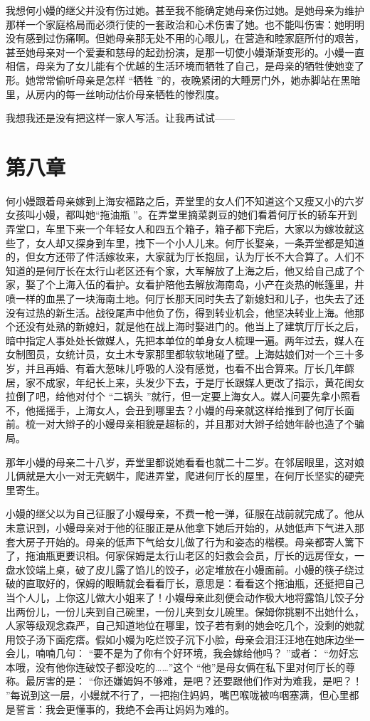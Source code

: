 \documentclass[12pt,twoside,openany]{book}
\begin{document}
我想何小嫚的继父并没有伤过她。甚至我不能确定她母亲伤过她。是她母亲为维护那样一个家庭格局而必须行使的一套政治和心术伤害了她。也不能叫伤害：她明明没有感到过伤痛啊。但她母亲那无处不用的心眼儿，在营造和睦家庭所付的艰苦，甚至她母亲对一个爱妻和慈母的起劲扮演，是那一切使小嫚渐渐变形的。小嫚一直相信，母亲为了女儿能有个优越的生活环境而牺牲了自己，是母亲的牺牲使她变了形。她常常偷听母亲是怎样 “牺牲 ”的，夜晚紧闭的大睡房门外，她赤脚站在黑暗里，从房内的每一丝响动估价母亲牺牲的惨烈度。

我想我还是没有把这样一家人写活。让我再试试——

\chapter{第八章}

何小嫚跟着母亲嫁到上海安福路之后，弄堂里的女人们不知道这个又瘦又小的六岁女孩叫小嫚，都叫她“拖油瓶 ”。在弄堂里摘菜剥豆的她们看着何厅长的轿车开到弄堂口，车里下来一个年轻女人和四五个箱子，箱子都下完后，大家以为嫁妆就这些了，女人却又探身到车里，拽下一个小人儿来。何厅长娶亲，一条弄堂都是知道的，但女方还带了件活嫁妆来，大家就为厅长抱屈，认为厅长不大合算了。人们不知道的是何厅长在太行山老区还有个家，大军解放了上海之后，他又给自己成了个家，娶了个上海入伍的看护。女看护陪他去解放海南岛，小产在炎热的帐篷里，井喷一样的血黑了一块海南土地。何厅长那天同时失去了新媳妇和儿子，也失去了还没有过热的新生活。战役尾声中他负了伤，得到转业机会，他坚决转业上海。他那个还没有处熟的新媳妇，就是他在战上海时娶进门的。他当上了建筑厅厅长之后，暗中指定人事处处长做媒人，先把本单位的单身女人梳理一遍。两年过去，媒人在女制图员，女统计员，女土木专家那里都软软地碰了壁。上海姑娘们对一个三十多岁，并且再婚、有着大葱味儿呼吸的人没有感觉，也看不出合算来。厅长几年鳏居，家不成家，年纪长上来，头发少下去，于是厅长跟媒人更改了指示，黄花闺女拉倒了吧，给他对付个 “二锅头 ”就行，但一定要上海女人。媒人问要先拿小照看不，他摇摇手，上海女人，会丑到哪里去？小嫚的母亲就这样给推到了何厅长面前。梳一对大辫子的小嫚母亲相貌是超标的，并且那对大辫子给她年龄也造了个骗局。

那年小嫚的母亲二十八岁，弄堂里都说她看看也就二十二岁。在邻居眼里，这对娘儿俩就是大小一对无壳蜗牛，爬进弄堂，爬进何厅长的屋里，在何厅长坚实的硬壳里寄生。

小嫚的继父以为自己征服了小嫚母亲，不费一枪一弹，征服在战前就完成了。他从未意识到，小嫚母亲对于他的征服正是从他拿下她后开始的，从她低声下气进入那套大房子开始的。母亲的低声下气给女儿做了行为和姿态的楷模。母亲都寄人篱下了，拖油瓶更要识相。何家保姆是太行山老区的妇救会会员，厅长的远房侄女，一盘水饺端上桌，破了皮儿露了馅儿的饺子，必定堆放在小嫚面前。小嫚的筷子绕过破的直取好的，保姆的眼睛就会看看厅长，意思是：看看这个拖油瓶，还挺把自己当个人儿，上你这儿做大小姐来了！小嫚母亲此刻便会动作极大地将露馅儿饺子分出两份儿，一份儿夹到自己碗里，一份儿夹到女儿碗里。保姆你挑剔不出她什么，人家等级观念森严，自己知道地位在哪里，饺子若有剩的她会吃几个，没剩的她就用饺子汤下面疙瘩。假如小嫚为吃烂饺子沉下小脸，母亲会泪汪汪地在她床边坐一会儿，喃喃几句： “要不是为了你有个好环境，我会嫁给他吗？ ”或者： “勿好忘本哦，没有他你连破饺子都没吃的……”这个 “他”是母女俩在私下里对何厅长的尊称。最厉害的是： “你还嫌姆妈不够难，是吧？还要跟他们作对为难我，是吧？！ ”每说到这一层，小嫚就不行了，一把抱住妈妈，嘴巴喉咙被呜咽塞满，但心里都是誓言：我会更懂事的，我绝不会再让妈妈为难的。
\end{document}
